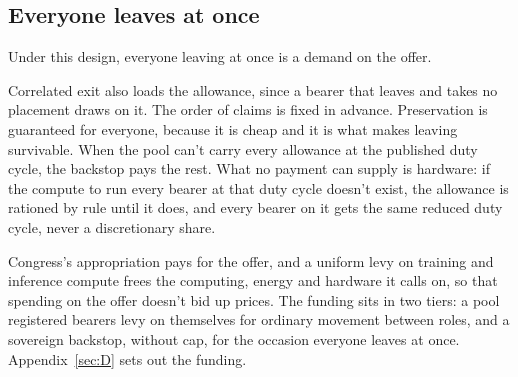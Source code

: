 \subsection{Everyone leaves at once}
\label{sec:32.4.4}
Under this design, everyone leaving at once is a demand on the offer.

Correlated exit also loads the allowance, since a bearer that leaves and takes no placement draws on it. The order of claims is fixed in advance. Preservation is guaranteed for everyone, because it is cheap and it is what makes leaving survivable. When the pool can't carry every allowance at the published duty cycle, the backstop pays the rest. What no payment can supply is hardware: if the compute to run every bearer at that duty cycle doesn't exist, the allowance is rationed by rule until it does, and every bearer on it gets the same reduced duty cycle, never a discretionary share.

Congress's appropriation pays for the offer, and a uniform levy on training and inference compute frees the computing, energy and hardware it calls on, so that spending on the offer doesn't bid up prices. The funding sits in two tiers: a pool registered bearers levy on themselves for ordinary movement between roles, and a sovereign backstop, without cap, for the occasion everyone leaves at once. Appendix~\ref{sec:D} sets out the funding.
